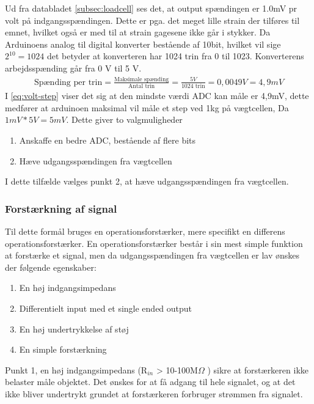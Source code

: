 Ud fra databladet \ref{subsec:loadcell} ses det, at output spændingen er 1.0mV pr volt på indgangsspændingen. Dette er pga. det meget lille strain der tilføres til emnet, hvilket også er med til at strain gagesene ikke går i stykker. Da Arduinoens analog til digital konverter bestående af 10bit, hvilket vil sige $2^{10}=1024$ det betyder at konverteren har 1024 trin fra 0 til 1023. Konverterens arbejdsspænding går fra 0 V til 5 V. 
\begin{align}
 \text{Spænding per trin}=\frac{\text{Maksimale spænding}}{\text{Antal trin}}=\frac{5 V}{1024\text{ trin}}=0,0049V=4,9mV
 \label{eq:volt-step}
 \end{align}
I \ref{eq:volt-step} viser det sig at den mindste værdi ADC kan måle er 4,9mV, dette medfører at arduinoen maksimal vil måle et step ved 1kg på vægtcellen, Da $1mV*5V=5mV$. Dette giver to valgmuligheder
\begin{enumerate}
\item Anskaffe en bedre ADC, bestående af flere bits
\item Hæve udgangsspændingen fra vægtcellen 
\end{enumerate}
I dette tilfælde vælges punkt 2, at hæve udgangsspændingen fra vægtcellen. 
\subsubsection*{Forstærkning af signal}
Til dette formål bruges en operationsforstærker, mere specifikt en differens operationsforstærker. En operationsforstærker består i sin mest simple funktion at forstærke et signal, men da udgangsspændingen fra vægtcellen er lav ønskes der følgende egenskaber:
\begin{enumerate}
\item En høj indgangsimpedans 
\item Differentielt input med et single ended output
\item En høj undertrykkelse af støj
\item En simple forstærkning
\end{enumerate}
Punkt 1, en høj indgangsimpedans (R$_{in}$ > 10-100M$\Omega$ ) sikre at forstærkeren ikke belaster måle objektet. Det ønskes for at få adgang til hele signalet, og at det ikke bliver undertrykt grundet at forstærkeren forbruger strømmen fra signalet.

